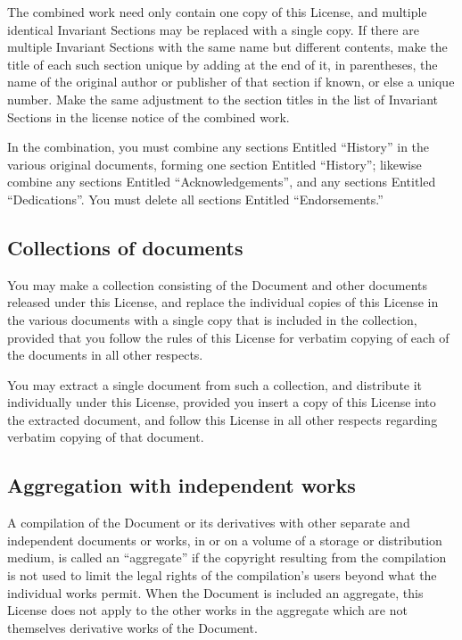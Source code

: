 {\tiny{}The combined work need only contain one copy of this License,
and multiple identical Invariant Sections may be replaced with a single
copy. If there are multiple Invariant Sections with the same name
but different contents, make the title of each such section unique
by adding at the end of it, in parentheses, the name of the original
author or publisher of that section if known, or else a unique number.
Make the same adjustment to the section titles in the list of Invariant
Sections in the license notice of the combined work.}{\tiny\par}

{\tiny{}In the combination, you must combine any sections Entitled
\textquotedblleft History\textquotedblright{} in the various original
documents, forming one section Entitled \textquotedblleft History\textquotedblright ;
likewise combine any sections Entitled \textquotedblleft Acknowledgements\textquotedblright ,
and any sections Entitled \textquotedblleft Dedications\textquotedblright .
You must delete all sections Entitled \textquotedblleft Endorsements.\textquotedblright{}}{\tiny\par}

\subsection*{{\tiny{}Collections of documents}}

{\tiny{}You may make a collection consisting of the Document and other
documents released under this License, and replace the individual
copies of this License in the various documents with a single copy
that is included in the collection, provided that you follow the rules
of this License for verbatim copying of each of the documents in all
other respects.}{\tiny\par}

{\tiny{}You may extract a single document from such a collection,
and distribute it individually under this License, provided you insert
a copy of this License into the extracted document, and follow this
License in all other respects regarding verbatim copying of that document.}{\tiny\par}

\subsection*{{\tiny{}Aggregation with independent works}}

{\tiny{}A compilation of the Document or its derivatives with other
separate and independent documents or works, in or on a volume of
a storage or distribution medium, is called an \textquotedblleft aggregate\textquotedblright{}
if the copyright resulting from the compilation is not used to limit
the legal rights of the compilation's users beyond what the individual
works permit. When the Document is included an aggregate, this License
does not apply to the other works in the aggregate which are not themselves
derivative works of the Document.}{\tiny\par}


